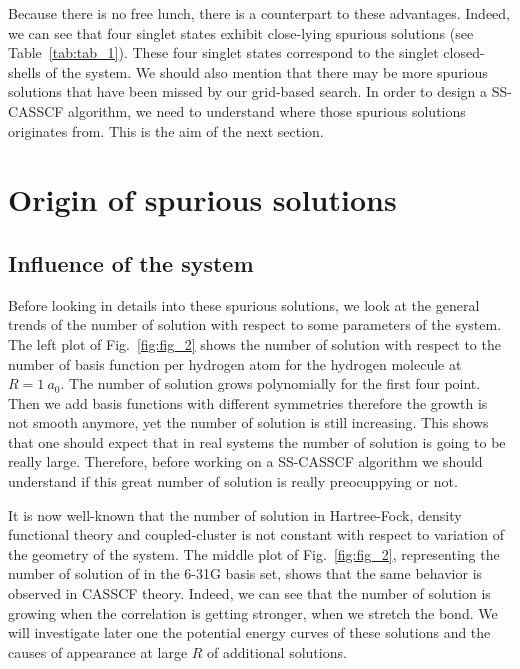 \documentclass[aps,prb,reprint,showkeys,superscriptaddress]{revtex4-1}
\begin{document}
Because there is no free lunch, there is a counterpart to these advantages. Indeed, we can see that four singlet states exhibit close-lying spurious solutions (see Table~\ref{tab:tab_1}).
These four singlet states correspond to the singlet closed-shells of the system.
We should also mention that there may be more spurious solutions that have been missed by our grid-based search.
In order to design a SS-CASSCF algorithm, we need to understand where those spurious solutions originates from.
This is the aim of the next section.

\section{Origin of spurious solutions}
\label{sec:origin}

\subsection{Influence of the system}
\label{sec:influence}

Before looking in details into these spurious solutions, we look at the general trends of the number of solution with respect to some parameters of the system.
The left plot of Fig.~\ref{fig:fig_2} shows the number of solution with respect to the number of basis function per hydrogen atom for the hydrogen molecule at $R=1~a_0$.
The number of solution grows polynomially for the first four point.
Then we add basis functions with different symmetries therefore the growth is not smooth anymore, yet the number of solution is still increasing.
This shows that one should expect that in real systems the number of solution is going to be really large.
Therefore, before working on a SS-CASSCF algorithm we should understand if this great number of solution is really preocuppying or not.

It is now well-known that the number of solution in Hartree-Fock, density functional theory and coupled-cluster is not constant with respect to variation of the geometry of the system.
The middle plot of Fig.~\ref{fig:fig_2}, representing the number of solution of  in the 6-31G basis set, shows that the same behavior is observed in CASSCF theory.
Indeed, we can see that the number of solution is growing when the correlation is getting stronger, \ie when we stretch the bond.
We will investigate later one the potential energy curves of these solutions and the causes of appearance at large $R$ of additional solutions.
\end{document}
